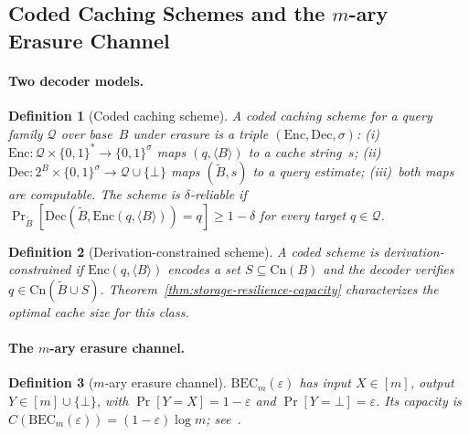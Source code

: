 \documentclass[journal]{IEEEtran}
\newcommand{\Cn}{\text{Cn}}
\newtheorem{definition}{Definition}[section]
\numberwithin{equation}{section}
\begin{document}
\subsection{Coded Caching Schemes and the \texorpdfstring{$m$}{m}-ary Erasure Channel}
\label{subsec:coded-caching}

\paragraph{Two decoder models.}

\begin{definition}[Coded caching scheme]
\label{def:coded-scheme}
A \emph{coded caching scheme} for a query family $\mathcal{Q}$
over base~$B$ under erasure is a triple
$(\mathrm{Enc},\mathrm{Dec},\sigma)$:
\textup{(i)}~$\mathrm{Enc}:\mathcal{Q}\times\{0,1\}^*
\to\{0,1\}^\sigma$ maps $(q,\langle B\rangle)$ to a cache
string~$s$;
\textup{(ii)}~$\mathrm{Dec}:2^B\times\{0,1\}^\sigma
\to\mathcal{Q}\cup\{\bot\}$ maps $(\tilde B,s)$ to a query
estimate;
\textup{(iii)}~both maps are computable.
The scheme is \emph{$\delta$-reliable} if
$\Pr_{\tilde B}[\mathrm{Dec}(\tilde B,
\mathrm{Enc}(q,\langle B\rangle))=q]\ge 1{-}\delta$
for every target $q\in\mathcal{Q}$.
\end{definition}

\begin{definition}[Derivation-constrained scheme]
\label{def:uncoded-scheme}
A coded scheme is \emph{derivation-constrained} if
$\mathrm{Enc}(q,\langle B\rangle)$ encodes a set
$S\subseteq\Cn(B)$ and the decoder verifies
$q\in\Cn(\tilde B\cup S)$.
Theorem~\ref{thm:storage-resilience-capacity} characterizes
the optimal cache size for this class.
\end{definition}

\paragraph{The $m$-ary erasure channel.}

\begin{definition}[$m$-ary erasure channel]
\label{def:m-ary-bec}
$\mathrm{BEC}_m(\varepsilon)$ has input $X\in[m]$,
output $Y\in[m]\cup\{\bot\}$, with
$\Pr[Y{=}X]=1{-}\varepsilon$ and $\Pr[Y{=}\bot]=\varepsilon$.
Its capacity is
$C(\mathrm{BEC}_m(\varepsilon))=(1{-}\varepsilon)\log m$;
see~\cite{cover2006elements}.
\end{definition}
\end{document}
